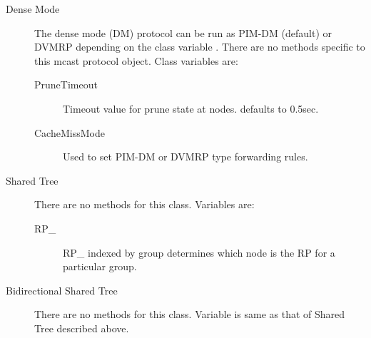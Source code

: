 \begin{flushleft}
\begin{description}
\item[Dense Mode]
The dense mode (DM) protocol can be run as PIM-DM (default) or DVMRP
depending on the class variable . There are no methods
specific to this mcast protocol object. Class variables are:
 \begin{description}
   \item[PruneTimeout] Timeout value for prune state at nodes. defaults to
0.5sec.
   \item[CacheMissMode] Used to set PIM-DM or DVMRP type forwarding rules.
 \end{description}


\item[Shared Tree]
There are no methods for this class. Variables are:
\begin{description}
\item[RP\_] RP\_ indexed by group determines which node is the RP for a
particular group.
\end{description}


\item[Bidirectional Shared Tree]
There are no methods for this class. Variable is same as that of Shared
Tree described above.

\end{description}

\end{flushleft}

\endinput
